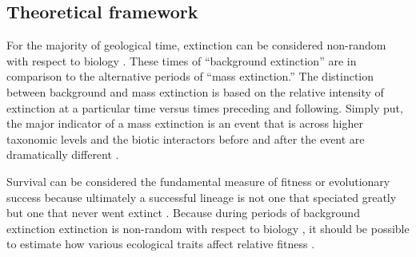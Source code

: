 \documentclass[12pt,letterpaper]{article}
\begin{document}


\subsection{Theoretical framework}
For the majority of geological time, extinction can be considered non-random with respect to biology \citep{Jablonski1986}. These times of ``background extinction'' are in comparison to the alternative periods of ``mass extinction.'' The distinction between background and mass extinction is based on the relative intensity of extinction at a particular time versus times preceding and following. Simply put, the major indicator of a mass extinction is an event that is across higher taxonomic levels and the biotic interactors before and after the event are dramatically different \citep{Jablonski1986,Jablonski2005,Kitchell1986,Kitchell1991}.

Survival can be considered the fundamental measure of fitness or evolutionary success because ultimately a successful lineage is not one that speciated greatly but one that never went extinct \citep{Cooper1984,Palmer2012}. Because during periods of background extinction extinction is non-random with respect to biology \citep{Jablonski1986}, it should be possible to estimate how various ecological traits affect relative fitness \citep{Kitchell1990,Kitchell1985a}. 
\end{document}
